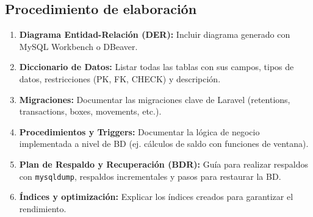 \documentclass[stu]{apa7}
\begin{document}
\subsection{Procedimiento de elaboración}

\begin{enumerate}
    \item \textbf{Diagrama Entidad-Relación (DER):} Incluir diagrama generado con MySQL Workbench o DBeaver.
    \item \textbf{Diccionario de Datos:} Listar todas las tablas con sus campos, tipos de datos, restricciones (PK, FK, CHECK) y descripción.
    \item \textbf{Migraciones:} Documentar las migraciones clave de Laravel (retentions, transactions, boxes, movements, etc.).
    \item \textbf{Procedimientos y Triggers:} Documentar la lógica de negocio implementada a nivel de BD (ej. cálculos de saldo con funciones de ventana).
    \item \textbf{Plan de Respaldo y Recuperación (BDR):} Guía para realizar respaldos con \texttt{mysqldump}, respaldos incrementales y pasos para restaurar la BD.
    \item \textbf{Índices y optimización:} Explicar los índices creados para garantizar el rendimiento.
\end{enumerate}
\end{document}
